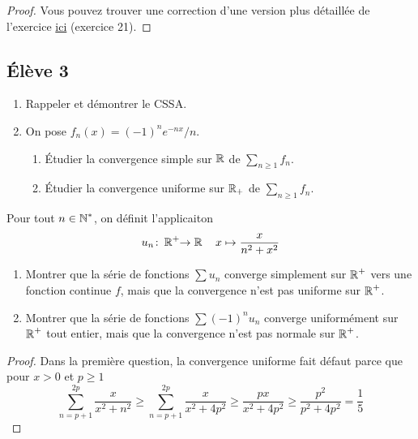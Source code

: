 \documentclass[10pt]{scrartcl}
\begin{document}
    \begin{proof}
        Vous pouvez trouver une correction d'une version plus détaillée de l'exercice \href{https://www.bibmath.net/ressources/index.php?action=affiche&quoi=mathspe/feuillesexo/suiserfonc&type=fexo}{ici} (exercice 21).
    \end{proof}

    \subsection*{Élève 3}
    \begin{ccp}\hfill
        \begin{enumerate}
            \item Rappeler et démontrer le CSSA.
            \item On pose $f_n(x)=(-1)^ne^{-nx}/n$. 
            \begin{enumerate}
                \item Étudier la convergence simple sur $\operatorname{\mathbb R}$ de $\sum_{n\geq 1} f_n$. 
                \item Étudier la convergence uniforme sur $\operatorname{\mathbb R}_+$ de $\sum_{n\geq 1} f_n$.
            \end{enumerate}
        \end{enumerate}
    \end{ccp}

    \begin{exo}
        Pour tout $n\in\operatorname{\mathbb N}^*$, on définit l'applicaiton
        \[
            u_n\colon\operatorname{\mathbb R}^+\hskip-.3em\to\operatorname{\mathbb R}\quad x\mapsto\frac x{n^2+x^2}
        \]
        \begin{enumerate}
            \item Montrer que la série de fonctions $\sum u_n$ converge simplement sur $\operatorname{\mathbb R}^+$ vers une fonction continue $f$, mais que la convergence n'est pas uniforme sur $\operatorname{\mathbb R}^+$.
            \item Montrer que la série de fonctions $\sum (-1)^nu_n$ converge uniformément sur $\operatorname{\mathbb R}^+$ tout entier, mais que la convergence n'est pas normale sur $\operatorname{\mathbb R}^+$.
        \end{enumerate}
    \end{exo}

    \begin{proof}
        Dans la première question, la convergence uniforme fait défaut parce que pour $x>0$ et $p\geq 1$
        \[
            \sum_{n=p+1}^{2p}\frac{x}{x^2+n^2}\geq\sum_{n=p+1}^{2p}\frac{x}{x^2+4p^2}\geq\frac{px}{x^2+4p^2}\geq\frac{p^2}{p^2+4p^2}=\frac15
        \]
    \end{proof}
\end{document}
